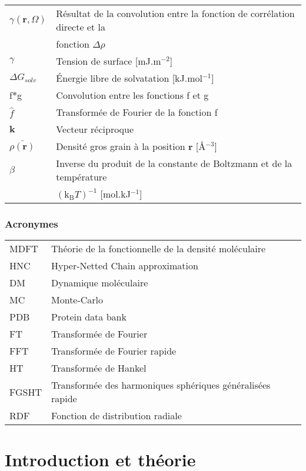 \documentclass{bredele}
\begin{document}
\begin{tabular}{l l}
$\gamma(\boldsymbol{r},\Omega)$ & Résultat de la convolution entre la  fonction de corrélation directe et la\\
& fonction $\Delta\rho$\\
$\gamma$ & Tension de surface [mJ.m$^{-2}$]\\
$\Delta G_{solv}$ & \'Energie libre de solvatation [kJ.mol$^{-1}$]\\
f$\ast$g & Convolution entre les fonctions f et g\\
$\hat{f}$ & Transformée de Fourier de la fonction f\\
$\boldsymbol{k}$ & Vecteur réciproque\\
$\bar{\rho(\boldsymbol{r})}$ & Densité gros grain à la position $\boldsymbol{r}$ [\AA$^{-3}$] \\
$\beta$ & Inverse du produit de la constante de Boltzmann et de la température \\
 & $(\mathrm{k_B}T)^{-1}$ [mol.kJ$^{-1}$]\\
\end{tabular}

\section*{Acronymes}
\begin{tabular}{ll}
MDFT & Théorie de la fonctionnelle de la densité moléculaire\\
HNC & Hyper-Netted Chain approximation\\
DM & Dynamique moléculaire \\
MC & Monte-Carlo \\
PDB & Protein data bank \\
FT & Transformée de Fourier \\
FFT & Transformée de Fourier rapide \\
HT & Transformée de Hankel \\
FGSHT & Transformée des harmoniques sphériques généralisées rapide \\
RDF & Fonction de distribution radiale\\
\end{tabular}







\clearemptydoublepage
\mainmatter

\part{Introduction et théorie}
\end{document}
